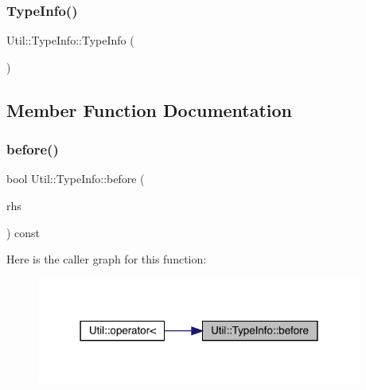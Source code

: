 \subsubsection{\texorpdfstring{TypeInfo()}{TypeInfo()}\hspace{0.1cm}{\footnotesize\ttfamily [4/4]}}
{\footnotesize\ttfamily Util\+::\+Type\+Info\+::\+Type\+Info (\begin{DoxyParamCaption}\item[{const std\+::type\+\_\+info \&}]{ }\end{DoxyParamCaption})}



\subsection{Member Function Documentation}
\mbox{\label{classUtil_1_1TypeInfo_a016c2263e881e81b956718c6571ac637}} 
\subsubsection{\texorpdfstring{before()}{before()}\hspace{0.1cm}{\footnotesize\ttfamily [1/2]}}
{\footnotesize\ttfamily bool Util\+::\+Type\+Info\+::before (\begin{DoxyParamCaption}\item[{const \mbox{\hyperlink{classUtil_1_1TypeInfo}{Type\+Info}} \&}]{rhs }\end{DoxyParamCaption}) const\hspace{0.3cm}{\ttfamily [inline]}}

Here is the caller graph for this function\+:\nopagebreak
\begin{figure}[H]
\begin{center}
\leavevmode
\includegraphics[width=303pt]{d5/d37/classUtil_1_1TypeInfo_a016c2263e881e81b956718c6571ac637_icgraph}
\end{center}
\end{figure}
\mbox{\label{classUtil_1_1TypeInfo_a016c2263e881e81b956718c6571ac637}} 
